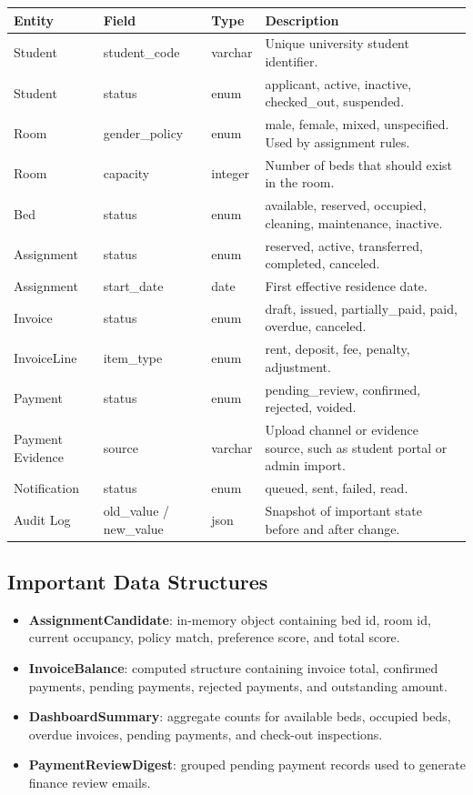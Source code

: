 \documentclass[11pt,a4paper]{article}
\begin{document}
\begin{longtable}{L{0.16\textwidth} L{0.21\textwidth} L{0.12\textwidth} L{0.36\textwidth}}
\toprule
\textbf{Entity} & \textbf{Field} & \textbf{Type} & \textbf{Description}\\
\midrule
\endhead
Student & student\_code & varchar & Unique university student identifier.\\
Student & status & enum & applicant, active, inactive, checked\_out, suspended.\\
Room & gender\_policy & enum & male, female, mixed, unspecified. Used by assignment rules.\\
Room & capacity & integer & Number of beds that should exist in the room.\\
Bed & status & enum & available, reserved, occupied, cleaning, maintenance, inactive.\\
Assignment & status & enum & reserved, active, transferred, completed, canceled.\\
Assignment & start\_date & date & First effective residence date.\\
Invoice & status & enum & draft, issued, partially\_paid, paid, overdue, canceled.\\
InvoiceLine & item\_type & enum & rent, deposit, fee, penalty, adjustment.\\
Payment & status & enum & pending\_review, confirmed, rejected, voided.\\
Payment Evidence & source & varchar & Upload channel or evidence source, such as student portal or admin import.\\
Notification & status & enum & queued, sent, failed, read.\\
Audit Log & old\_value / new\_value & json & Snapshot of important state before and after change.\\
\bottomrule
\end{longtable}

\subsection{Important Data Structures}
\begin{itemize}
  \item \textbf{AssignmentCandidate}: in-memory object containing bed id, room id, current occupancy, policy match, preference score, and total score.
  \item \textbf{InvoiceBalance}: computed structure containing invoice total, confirmed payments, pending payments, rejected payments, and outstanding amount.
  \item \textbf{DashboardSummary}: aggregate counts for available beds, occupied beds, overdue invoices, pending payments, and check-out inspections.
  \item \textbf{PaymentReviewDigest}: grouped pending payment records used to generate finance review emails.
\end{itemize}
\end{document}
